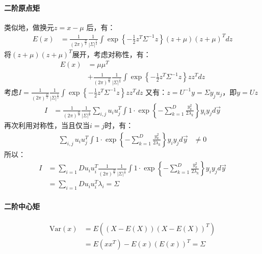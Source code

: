 \documentclass[cn,black,12pt,normal]{elegantnote}
\begin{document}
\paragraph{二阶原点矩}
类似地，做换元$z = x - \mu$ 后，有：
\begin{align*}
    E(x) & = \frac{1}{(2\pi )^{\frac{D }{2} }} \frac{1}{\left | \Sigma  \right |^{\frac{1}{2} }  }\int
    \exp\left \{ -\frac{1}{2} z^T\Sigma^{-1}z \right \}(z+\mu)(z+\mu)^T dz
\end{align*}
将$(z+\mu)(z+\mu)^T$展开，考虑对称性，有：
\begin{align*}
    E(x) & = \mu\mu^T \\ & + \frac{1}{(2\pi )^{\frac{D }{2} }} \frac{1}{\left | \Sigma  \right |^{\frac{1}{2} }  }\int
    \exp\left \{ -\frac{1}{2} z^T\Sigma^{-1}z \right \} zz^T dz
\end{align*}
考虑$I = \frac{1}{(2\pi )^{\frac{D }{2} }} \frac{1}{\left | \Sigma  \right |^{\frac{1}{2} }  }\int
    \exp\left \{ -\frac{1}{2} z^T\Sigma^{-1}z \right \} zz^T dz$
又有：$z = U^{-1}y = \Sigma y_ju_j$，即$y=Uz$
\begin{align*}
    I & = \frac{1}{(2\pi )^{\frac{D }{2} }} \frac{1}{\left | \Sigma  \right |^{\frac{1}{2} }  }\sum_{i,j}u_iu_j^T \int 1 \cdot
    \exp\left \{ -\sum_{k=1}^{D} \frac{y_k^2}{2\lambda_k} \right \} y_i y_j d\vec{y}
\end{align*}
再次利用对称性，当且仅当$i=j$时，有：
\begin{align*}
    \sum_{i,j}u_iu_j^T \int 1 \cdot
    \exp\left \{ -\sum_{k=1}^{D} \frac{y_k^2}{2\lambda_k} \right \} y_i y_j d\vec{y} & \neq 0
\end{align*}
所以：
\begin{align*}
    I & = \sum_{i=1}{D}u_iu_i^T \frac{1}{(2\pi )^{\frac{D }{2} }} \frac{1}{\left | \Sigma  \right |^{\frac{1}{2} }  } \int 1 \cdot
    \exp\left \{ -\sum_{k=1}^{D} \frac{y_k^2}{2\lambda_k} \right \} y_i y_j d\vec{y}                                               \\ & = \sum_{i=1}{D}u_iu_i^T \lambda_i = \Sigma
\end{align*}

\paragraph{二阶中心矩}
\begin{align*}
    \text{Var}(x) & = E((X-E(X))(X-E(X))^T)
    \\ & = E(xx^T) - E(x)(E(x))^T = \Sigma
\end{align*}
\end{document}
